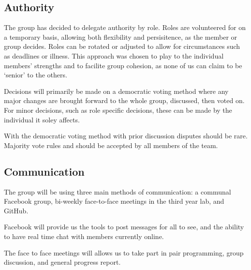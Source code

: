 \subsection{Authority}

The group has decided to delegate authority by role. Roles are volunteered for
on a temporary basis, allowing both flexibility and persisitence, as the
member or group decides. Roles can be rotated or adjusted to allow for
circumstances such as deadlines or illness. This approach was chosen to play
to the individual members' strengths and to facilite group cohesion, as none
of us can claim to be `senior' to the others.

Decisions will primarily be made on a democratic voting method where any
major changes are brought forward to the whole group, discussed, then voted
on. For minor decisions, such as role specific decisions, these can be made
by the individual it soley affects.

With the democratic voting method with prior discussion disputes should be
rare. Majority vote rules and should be accepted by all members of the team.

\subsection{Communication}

The group will be using three main methods of communication: a communal
Facebook group, bi-weekly face-to-face meetings in the third year lab,
and GitHub.

Facebook will provide us the tools to post messages for all to see, and the
ability to have real time chat with members currently online.

The face to face meetings will allows us to take part in pair programming,
group discussion, and general progress report.
